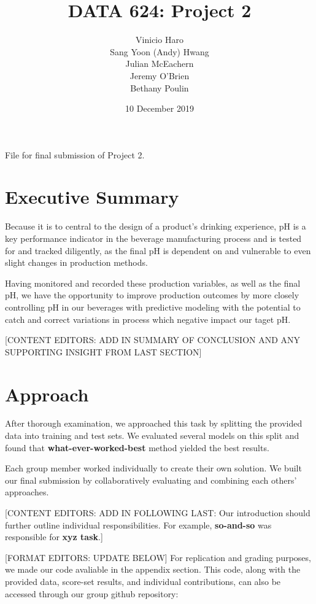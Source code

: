 \documentclass[]{report}
\title{DATA 624: Project 2}
\author{Vinicio Haro \\ Sang Yoon (Andy) Hwang \\ Julian McEachern \\ Jeremy O'Brien \\ Bethany Poulin}
\date{10 December 2019}
\begin{document}
\maketitle

{
\setcounter{tocdepth}{1}
\tableofcontents
}
File for final submission of Project 2.

\thispagestyle{empty}
\newpage
\clearpage
{}

\hypertarget{executive-summary}{%
\chapter{Executive Summary}\label{executive-summary}}

Because it is to central to the design of a product's drinking
experience, pH is a key performance indicator in the beverage
manufacturing process and is tested for and tracked diligently, as the
final pH is dependent on and vulnerable to even slight changes in
production methods.

Having monitored and recorded these production variables, as well as the
final pH, we have the opportunity to improve production outcomes by more
closely controlling pH in our beverages with predictive modeling with
the potential to catch and correct variations in process which negative
impact our taget pH.

{[}CONTENT EDITORS: ADD IN SUMMARY OF CONCLUSION AND ANY SUPPORTING
INSIGHT FROM LAST SECTION{]}

\hypertarget{approach}{%
\chapter{Approach}\label{approach}}

After thorough examination, we approached this task by splitting the
provided data into training and test sets. We evaluated several models
on this split and found that \textbf{what-ever-worked-best} method
yielded the best results.

Each group member worked individually to create their own solution. We
built our final submission by collaboratively evaluating and combining
each others' approaches.

{[}CONTENT EDITORS: ADD IN FOLLOWING LAST: Our introduction should
further outline individual responsibilities. For example,
\textbf{so-and-so} was responsible for \textbf{xyz task}.{]}

{[}FORMAT EDITORS: UPDATE BELOW{]} For replication and grading purposes,
we made our code avaliable in the appendix section. This code, along
with the provided data, score-set results, and individual contributions,
can also be accessed through our group github repository:
\end{document}
